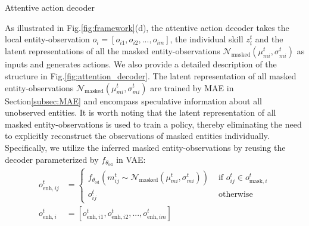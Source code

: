 \begin{algorithm}[]
\label{algorithm2}
\caption{Attentive action decoder}
    \begin{algorithmic}[1]
\end{algorithmic}
\label{action_decoder}
\end{algorithm}
As illustrated in Fig.\ref{fig:framework}(d), the attentive action decoder takes the local entity-observation $o_i = [o_{i1},o_{i2},...,o_{im}]$, the individual skill $z_i^t$ and the latent representations of all the masked entity-observations $\mathcal{N}_{\mathrm{masked}}(\mu_{mi}^t, \sigma_{mi}^t)$ as inputs and generates actions. We also provide a detailed description of the structure in Fig.\ref{fig:attention_decoder}. The latent representation of all masked entity-observations $\mathcal{N}_{\mathrm{masked}}(\mu_{mi}^t, \sigma_{mi}^t)$ are trained by MAE in Section\ref{subsec:MAE} and encompass speculative information about all unobserved entities. It is worth noting that the latent representation of all masked entity-observations is used to train a policy, thereby eliminating the need to explicitly reconstruct the observations of masked entities individually. Specifically, we utilize the inferred masked entity-observations by reusing the decoder parameterized by $f_{\theta_{\mathrm{od}}}$ in VAE:
\begin{equation}
\begin{split}
o_{\mathrm{enh},ij}^t&=\left\{\begin{array}{cc}
f_{\theta_{\mathrm{od}}}(m_{ij}^t \sim \mathcal{N}_{\mathrm{masked}}(\mu_{mi}^t, \sigma_{mi}^t)) & \text { if } o_{ij}^t \in o_{\mathrm{mask},i}^t \\
o_{ij}^t & \text { otherwise }
\end{array}\right.\\
o_{\mathrm{enh},i}^t&=[o_{\mathrm{enh},i1}^t,o_{\mathrm{enh},i2}^t,...,o_{\mathrm{enh},im}^t]
\end{split}
\label{eq:(7)}
\end{equation}
